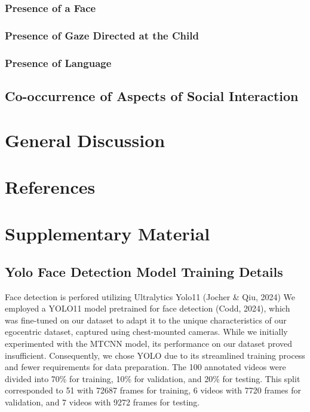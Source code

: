 \documentclass[
  man,floatsintext]{apa6}
\begin{document}
\subsubsection{Presence of a Face}\label{presence-of-a-face}

\subsubsection{Presence of Gaze Directed at the Child}\label{presence-of-gaze-directed-at-the-child}

\subsubsection{Presence of Language}\label{presence-of-language}

\subsection{Co-occurrence of Aspects of Social Interaction}\label{co-occurrence-of-aspects-of-social-interaction}

\section{General Discussion}\label{general-discussion}

\newpage

\section{References}\label{references}

\newpage

\section{Supplementary Material}\label{supplementary-material}

\subsection{Yolo Face Detection Model Training Details}\label{yolo-face-detection-model-training-details}

Face detection is perfored utilizing Ultralytics Yolo11 (Jocher \& Qiu, 2024)
We employed a YOLO11 model pretrained for face detection (Codd, 2024), which was fine-tuned on our dataset to adapt it to the unique characteristics of our egocentric dataset, captured using chest-mounted cameras. While we initially experimented with the MTCNN model, its performance on our dataset proved insufficient. Consequently, we chose YOLO due to its streamlined training process and fewer requirements for data preparation. The 100 annotated videos were divided into 70\% for training, 10\% for validation, and 20\% for testing. This split corresponded to 51 with 72687 frames for training, 6 videos with 7720 frames for validation, and 7 videos with 9272 frames for testing.
\end{document}
